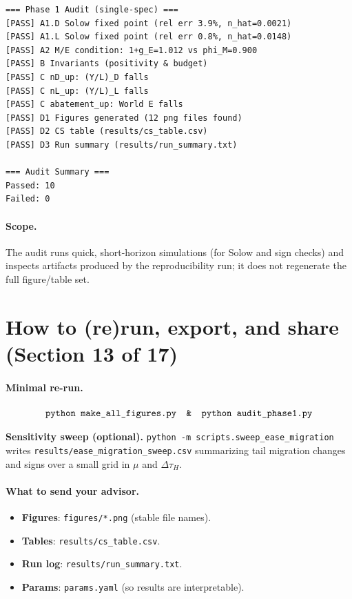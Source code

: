 \documentclass[12pt,a4paper]{article}
\newcommand{\code}[1]{\texttt{#1}}
\begin{document}
\begin{verbatim}
=== Phase 1 Audit (single-spec) ===
[PASS] A1.D Solow fixed point (rel err 3.9%, n_hat=0.0021)
[PASS] A1.L Solow fixed point (rel err 0.8%, n_hat=0.0148)
[PASS] A2 M/E condition: 1+g_E=1.012 vs phi_M=0.900
[PASS] B Invariants (positivity & budget)
[PASS] C nD_up: (Y/L)_D falls
[PASS] C nL_up: (Y/L)_L falls
[PASS] C abatement_up: World E falls
[PASS] D1 Figures generated (12 png files found)
[PASS] D2 CS table (results/cs_table.csv)
[PASS] D3 Run summary (results/run_summary.txt)

=== Audit Summary ===
Passed: 10
Failed: 0
\end{verbatim}

\paragraph{Scope.} The audit runs quick, short-horizon simulations (for Solow and sign checks) and inspects artifacts produced by the reproducibility run; it does not regenerate the full figure/table set.



\section{How to (re)run, export, and share (Section 13 of 17)}
\paragraph{Minimal re-run.}
\[
\code{python\ make\_all\_figures.py\quad \&\quad python\ audit\_phase1.py}
\]

\begin{mdframed}[backgroundcolor=gray!08,linewidth=0.5pt]
\textbf{Sensitivity sweep (optional).}\quad
\code{python -m scripts.sweep\_ease\_migration}
\;writes \code{results/ease\_migration\_sweep.csv} summarizing tail migration changes and signs over a small grid in \(\mu\) and \(\Delta\tau_H\).
\end{mdframed}

\paragraph{What to send your advisor.}
\begin{itemize}[leftmargin=1.25em]
  \item \textbf{Figures}: \code{figures/*.png} (stable file names).
  \item \textbf{Tables}: \code{results/cs\_table.csv}.
  \item \textbf{Run log}: \code{results/run\_summary.txt}.
  \item \textbf{Params}: \code{params.yaml} (so results are interpretable).
\end{itemize}
\end{document}
